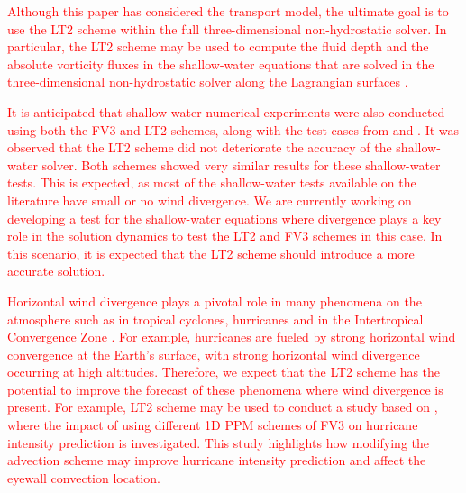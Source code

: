 \documentclass[preprint,12pt]{elsarticle}
\begin{document}
\begin{linenumbers}



\textcolor{red}{
Although this paper has considered the transport model, the ultimate goal is to use the LT2 scheme within the full three-dimensional non-hydrostatic solver. 
In particular, the LT2 scheme may be used to compute the fluid depth and the absolute vorticity fluxes in the shallow-water equations that are solved in the three-dimensional non-hydrostatic solver along the Lagrangian surfaces \cite{lin:2004}.}

\textcolor{red}{
It is anticipated that shallow-water numerical experiments were also conducted using both the FV3 and LT2 schemes, along with the test cases from \cite{will:1992} and \cite{galewsky:2004}. It was observed that the LT2 scheme did not deteriorate the accuracy of the shallow-water solver. 
Both schemes showed very similar results for these shallow-water tests.
This is expected, as most of the shallow-water tests available on the literature have small or no wind divergence.
We are currently working on developing a test for the shallow-water equations where divergence plays a key role in the solution dynamics to test the LT2 and FV3 schemes in this case.
In this scenario, it is expected that the LT2 scheme should introduce a more accurate solution.}

\textcolor{red}{
Horizontal wind divergence plays a pivotal role in many phenomena on the atmosphere such as in tropical cyclones, hurricanes and in the Intertropical Convergence Zone \cite{holton:2012}.
For example, hurricanes are fueled by strong horizontal wind convergence at the Earth’s surface, with strong horizontal wind divergence occurring at high altitudes.
Therefore, we expect that the LT2 scheme has the potential to improve the forecast of these phenomena where wind divergence is present.
For example, LT2 scheme may be used to conduct a study based on \cite{gao:2021}, where the impact of using different 1D PPM schemes of FV3 on hurricane intensity prediction is investigated. 
This study highlights how modifying the advection scheme may improve hurricane intensity prediction and affect the eyewall convection location.
}



\end{linenumbers}
\end{document}
